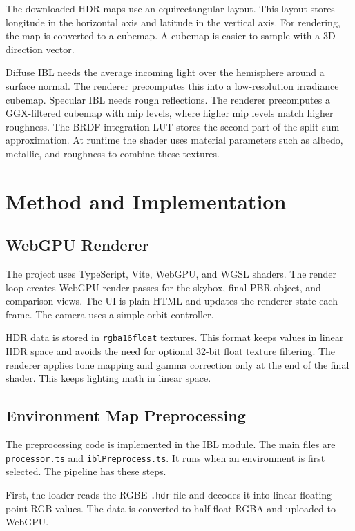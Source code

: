 \documentclass{egpubl}
\newcommand{\code}[1]{{\scriptsize\texttt{#1}}}
\begin{document}
The downloaded HDR maps use an equirectangular layout.
This layout stores longitude in the horizontal axis and latitude in the vertical axis.
For rendering, the map is converted to a cubemap.
A cubemap is easier to sample with a 3D direction vector.

Diffuse IBL needs the average incoming light over the hemisphere around a surface normal.
The renderer precomputes this into a low-resolution irradiance cubemap.
Specular IBL needs rough reflections.
The renderer precomputes a GGX-filtered cubemap with mip levels, where higher mip levels match higher roughness.
The BRDF integration LUT stores the second part of the split-sum approximation.
At runtime the shader uses material parameters such as albedo, metallic, and roughness to combine these textures.

\section{Method and Implementation}

\subsection{WebGPU Renderer}

The project uses TypeScript, Vite, WebGPU, and WGSL shaders.
The render loop creates WebGPU render passes for the skybox, final PBR object, and comparison views.
The UI is plain HTML and updates the renderer state each frame.
The camera uses a simple orbit controller.

HDR data is stored in \texttt{rgba16float} textures.
This format keeps values in linear HDR space and avoids the need for optional 32-bit float texture filtering.
The renderer applies tone mapping and gamma correction only at the end of the final shader.
This keeps lighting math in linear space.

\subsection{Environment Map Preprocessing}

The preprocessing code is implemented in the IBL module.
The main files are \code{processor.ts} and \code{iblPreprocess.ts}.
It runs when an environment is first selected.
The pipeline has these steps.

First, the loader reads the RGBE \texttt{.hdr} file and decodes it into linear floating-point RGB values.
The data is converted to half-float RGBA and uploaded to WebGPU.
\end{document}
